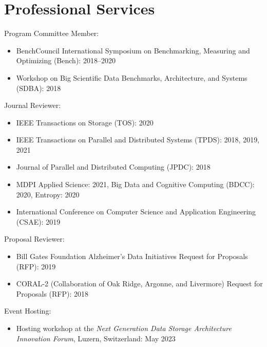 \section{Professional Services}
Program Committee Member:
\begin{itemize}
\item {BenchCouncil International Symposium on Benchmarking, Measuring and Optimizing (Bench): 2018--2020}
\item {Workshop on Big Scientific Data Benchmarks, Architecture, and Systems (SDBA): 2018}
\end{itemize}
Journal Reviewer:
\begin{itemize}
\item {IEEE Transactions on Storage (TOS): 2020}
\item {IEEE Transactions on Parallel and Distributed Systems (TPDS): 2018, 2019, 2021}
\item {Journal of Parallel and Distributed Computing (JPDC): 2018}
\item {MDPI Applied Science: 2021,
Big Data and Cognitive Computing (BDCC): 2020,
Entropy: 2020}
\item {International Conference on Computer Science and Application Engineering (CSAE): 2019}
\end{itemize}
Proposal Reviewer:
\begin{itemize}
\item {Bill Gates Foundation Alzheimer’s Data Initiatives Request for Proposals (RFP): 2019}
\item {CORAL-2 (Collaboration of Oak Ridge, Argonne, and Livermore) Request for Proposals (RFP): 2018}
\end{itemize}
Event Hosting:
\begin{itemize}
    \item{Hosting workshop at the {\it Next Generation Data Storage Architecture Innovation Forum}, Luzern, Switzerland}: May 2023
\end{itemize}

